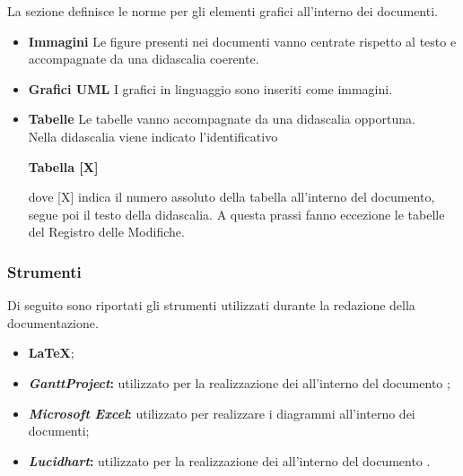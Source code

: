 La sezione definisce le norme per gli elementi grafici all'interno dei documenti.
\begin{itemize}
\item\textbf{Immagini}
Le figure presenti nei documenti vanno centrate rispetto al testo e accompagnate da una didascalia coerente.
\item\textbf{Grafici UML}
I grafici in linguaggio  sono inseriti come immagini.
\item\textbf{Tabelle}
Le tabelle vanno accompagnate da una didascalia opportuna.\\
Nella didascalia viene indicato l'identificativo 
\begin{center}
	\textbf{Tabella [X]} 
\end{center}
dove [X] indica il numero assoluto della tabella all'interno del documento, segue poi il testo della didascalia.
A questa prassi fanno eccezione le tabelle del Registro delle Modifiche.
\end{itemize}

\subsubsection{Strumenti} \label{Documentazione_Strumenti}
Di seguito sono riportati gli strumenti utilizzati durante la redazione della documentazione.
\begin{itemize}
	\item \textbf{\LaTeX};
	\item \textbf{\textit{GanttProject}:} utilizzato per la realizzazione dei  all'interno del documento ;
	\item \textbf{\textit{Microsoft Excel}:} utilizzato per realizzare i diagrammi all'interno dei documenti;
	\item \textbf{\textit{Lucidhart}:} utilizzato per la realizzazione dei  all'interno del documento .
\end{itemize}


